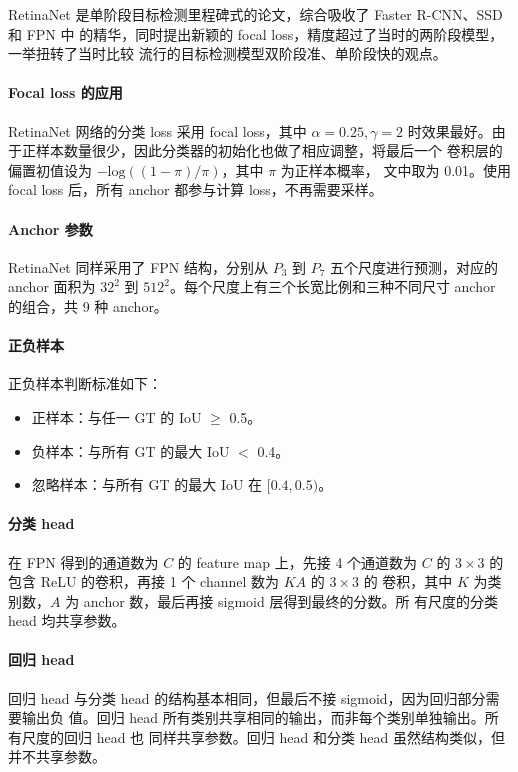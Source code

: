 RetinaNet 是单阶段目标检测里程碑式的论文，综合吸收了 Faster R-CNN、SSD 和 FPN 中
的精华，同时提出新颖的 focal loss，精度超过了当时的两阶段模型，一举扭转了当时比较
流行的目标检测模型双阶段准、单阶段快的观点。

\paragraph{Focal loss 的应用}
RetinaNet 网络的分类 loss 采用 focal loss，其中 $\alpha = 0.25, \gamma
= 2$ 时效果最好。由于正样本数量很少，因此分类器的初始化也做了相应调整，将最后一个
卷积层的偏置初值设为 $-\mathrm{log}((1 - \pi)/ \pi)$，其中 $\pi$ 为正样本概率，
文中取为 0.01。使用 focal loss 后，所有 anchor 都参与计算 loss，不再需要采样。

\paragraph{Anchor 参数}
RetinaNet 同样采用了 FPN 结构，分别从 $P_3$ 到 $P_7$ 五个尺度进行预测，对应的
anchor 面积为 $32^2$ 到 $512^2$。每个尺度上有三个长宽比例和三种不同尺寸 anchor
的组合，共 9 种 anchor。

\paragraph{正负样本}
正负样本判断标准如下：
\begin{itemize}
  \item 正样本：与任一 GT 的 IoU $\geq$ 0.5。
  \item 负样本：与所有 GT 的最大 IoU $ < $ 0.4。
  \item 忽略样本：与所有 GT 的最大 IoU 在 $[0.4, 0.5)$。
\end{itemize}

\paragraph{分类 head}
在 FPN 得到的通道数为 $C$ 的 feature map 上，先接 4 个通道数为 $C$ 的
$3 \times 3$ 的包含 ReLU 的卷积，再接 1 个 channel 数为 $KA$ 的 $3 \times 3$ 的
卷积，其中 $K$ 为类别数，$A$ 为 anchor 数，最后再接 sigmoid 层得到最终的分数。所
有尺度的分类 head 均共享参数。

\paragraph{回归 head}
回归 head 与分类 head 的结构基本相同，但最后不接 sigmoid，因为回归部分需要输出负
值。回归 head 所有类别共享相同的输出，而非每个类别单独输出。所有尺度的回归 head 也
同样共享参数。回归 head 和分类 head 虽然结构类似，但并不共享参数。

